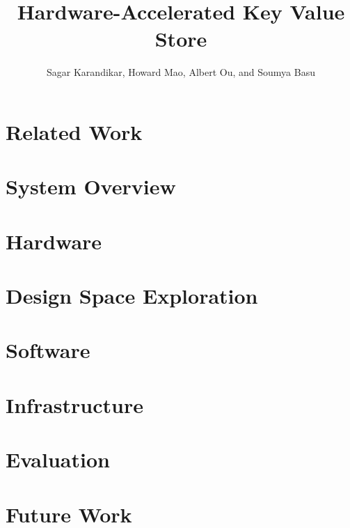 \documentclass[conference]{IEEEtran}
\title{Hardware-Accelerated Key Value Store}
\author{Sagar Karandikar, Howard Mao, Albert Ou, and Soumya Basu}
\begin{document}
\maketitle





\section{Related Work}



\section{System Overview}



\section{Hardware}




\section{Design Space Exploration}



\section{Software}



\section{Infrastructure}



\section{Evaluation}



\section{Future Work}






\nocite{*}
\printbibliography
\end{document}
